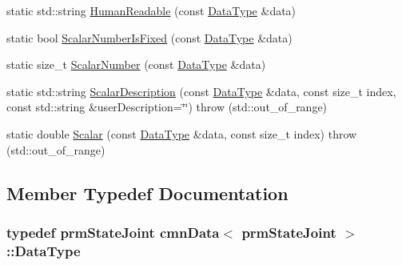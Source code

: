 \begin{DoxyCompactItemize}
static std\-::string \hyperlink{classcmn_data_3_01prm_state_joint_01_4_aad662b8fff129925a9f0b10b8637e971}{Human\-Readable} (const \hyperlink{classcmn_data_3_01prm_state_joint_01_4_a65f7d3cb2fc06e658c5fc9f417b585ee}{Data\-Type} \&data)
\item 
static bool \hyperlink{classcmn_data_3_01prm_state_joint_01_4_a07a50e9f9639cbaf06a4bb2369eb473d}{Scalar\-Number\-Is\-Fixed} (const \hyperlink{classcmn_data_3_01prm_state_joint_01_4_a65f7d3cb2fc06e658c5fc9f417b585ee}{Data\-Type} \&data)
\item 
static size\-\_\-t \hyperlink{classcmn_data_3_01prm_state_joint_01_4_a51d00a0ef806455eb5ea53a0f6011856}{Scalar\-Number} (const \hyperlink{classcmn_data_3_01prm_state_joint_01_4_a65f7d3cb2fc06e658c5fc9f417b585ee}{Data\-Type} \&data)
\item 
static std\-::string \hyperlink{classcmn_data_3_01prm_state_joint_01_4_a1dbe55bd107eb5d1e45b1645e8dd07b6}{Scalar\-Description} (const \hyperlink{classcmn_data_3_01prm_state_joint_01_4_a65f7d3cb2fc06e658c5fc9f417b585ee}{Data\-Type} \&data, const size\-\_\-t index, const std\-::string \&user\-Description=\char`\"{}\char`\"{})  throw (std\-::out\-\_\-of\-\_\-range)
\item 
static double \hyperlink{classcmn_data_3_01prm_state_joint_01_4_a1a337b1499684d85a28b8498ac9b4984}{Scalar} (const \hyperlink{classcmn_data_3_01prm_state_joint_01_4_a65f7d3cb2fc06e658c5fc9f417b585ee}{Data\-Type} \&data, const size\-\_\-t index)  throw (std\-::out\-\_\-of\-\_\-range)
\end{DoxyCompactItemize}


\subsection{Member Typedef Documentation}
\hypertarget{classcmn_data_3_01prm_state_joint_01_4_a65f7d3cb2fc06e658c5fc9f417b585ee}{
\subsubsection[{Data\-Type}]{\setlength{\rightskip}{0pt plus 5cm}typedef {\bf prm\-State\-Joint} {\bf cmn\-Data}$<$ {\bf prm\-State\-Joint} $>$\-::{\bf Data\-Type}}}\label{classcmn_data_3_01prm_state_joint_01_4_a65f7d3cb2fc06e658c5fc9f417b585ee}


